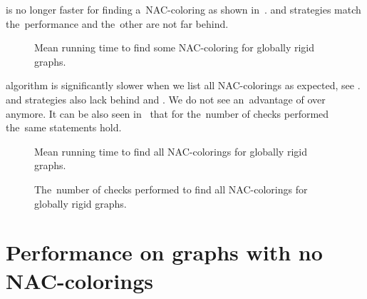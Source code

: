 \NaiveCycles{} is no longer faster for finding a~NAC-coloring
as shown in~.
\None{} and \Neighbors{} strategies match the~performance and
the~other are not far behind.
%
\begin{figure}[thbp]
	\centering
	\scalebox{\BenchFigureScale}{}
	\caption[Mean runtime for globally rigid graphs (some)]{
		Mean running time to find some NAC-coloring for globally rigid graphs.}%
	\label{fig:graph_globally_rigid_first_runtime}
\end{figure}%

\NaiveCycles{} algorithm is significantly slower when we list all NAC-colorings
as expected, see .
\None{} and \CycleMask{} strategies also lack behind \Neighbors{} and \NeighborsDegree{}.
We do not see an~advantage of \MergeLinear{} over \SharedVertices{} anymore.
%
It can be also seen in~
that for the~number of checks performed the~same statements hold.
%
\begin{figure}[thbp]
	\centering
	\scalebox{\BenchFigureScale}{}
	\caption[Mean runtime for globally rigid graphs (all)]{
		Mean running time to find all NAC-colorings for globally rigid graphs.}%
	\label{fig:graph_globally_rigid_all_runtime}
\end{figure}%
\begin{figure}[thbp]
	\centering
	\scalebox{\BenchFigureScale}{}
	\caption[Checks performed for globally rigid graphs (all)]{
		The~number of checks performed to find all NAC-colorings for globally rigid graphs.}%
	\label{fig:graph_globally_rigid_all_checks}
\end{figure}%



\section{Performance on graphs with no NAC-colorings}

